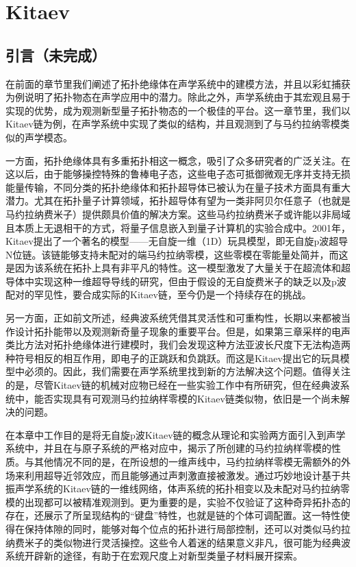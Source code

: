 \chapter{Kitaev}

\section{引言（未完成）}

在前面的章节里我们阐述了拓扑绝缘体在声学系统中的建模方法，并且以彩虹捕获为例说明了拓扑物态在声学应用中的潜力。除此之外，声学系统由于其宏观且易于实现的优势，成为观测新型量子拓扑物态的一个极佳的平台。这一章节里，我们以Kitaev链为例，在声学系统中实现了类似的结构，并且观测到了与马约拉纳零模类似的声学模态。

一方面，拓扑绝缘体具有多重拓扑相这一概念，吸引了众多研究者的广泛关注。在这以后，由于能够操控特殊的鲁棒电子态，这些电子态可抵御微观无序并支持无损能量传输，不同分类的拓扑绝缘体和拓扑超导体已被认为在量子技术方面具有重大潜力。尤其在拓扑量子计算领域，拓扑超导体有望为一类非阿贝尔任意子（也就是马约拉纳费米子）提供颇具价值的解决方案。这些马约拉纳费米子或许能以非局域且本质上无退相干的方式，将量子信息嵌入到量子计算机的实验合成中\cite{r31,r32,r33}。2001年，Kitaev提出了一个著名的模型——无自旋一维（1D）玩具模型，即无自旋p波超导N位链。该链能够支持未配对的端马约拉纳零模，这些零模在零能量处简并，而这是因为该系统在拓扑上具有非平凡的特性\cite{r4}。这一模型激发了大量关于在超流体和超导体中实现这种一维超导导线的研究\cite{r51,r52,r53,r54,r55,r56,r57,r58,r59,r510}，但由于假设的无自旋费米子的缺乏以及p波配对的罕见性，要合成实际的Kitaev链，至今仍是一个持续存在的挑战。

另一方面，正如前文所述，经典波系统凭借其灵活性和可重构性，长期以来都被当作设计拓扑能带以及观测新奇量子现象的重要平台。但是，如果第三章采样的电声类比方法对拓扑绝缘体进行建模时，我们会发现这种方法亚波长尺度下无法构造两种符号相反的相互作用，即电子的正跳跃和负跳跃。而这是Kitaev提出它的玩具模型中必须的。因此，我们需要在声学系统里找到新的方法解决这个问题。值得关注的是，尽管Kitaev链的机械对应物已经在一些实验工作中有所研究\cite{C54}，但在经典波系统中，能否实现具有可观测马约拉纳样零模的Kitaev链类似物，依旧是一个尚未解决的问题。

在本章中工作目的是将无自旋p波Kitaev链的概念从理论和实验两方面引入到声学系统中，并且在与原子系统的严格对应中，揭示了所创建的马约拉纳样零模的性质。与其他情况不同的是，在所设想的一维声线中，马约拉纳样零模无需额外的外场来利用超导近邻效应，而且能够通过声刺激直接被激发。通过巧妙地设计基于共振声学系统的Kitaev链的一维线网络，体声系统的拓扑相变以及未配对马约拉纳零模的出现都可以被精准观测到。更为重要的是，实验不仅验证了这种奇异拓扑态的存在，还展示了所呈现结构的“键盘”特性，也就是链的个体可调配置。这一特性使得在保持体隙的同时，能够对每个位点的拓扑进行局部控制，还可以对类似马约拉纳费米子的类似物进行灵活操控。这些令人着迷的结果意义非凡，很可能为经典波系统开辟新的途径，有助于在宏观尺度上对新型类量子材料展开探索。

